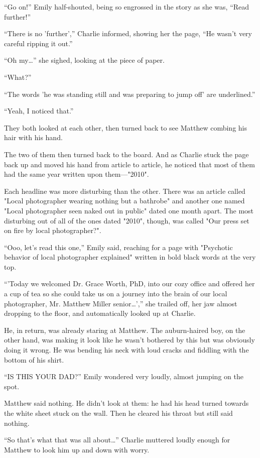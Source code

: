 “Go on!” Emily half-shouted, being so engrossed in the story as she was, “Read further!”

“There is no 'further',” Charlie informed, showing her the page, “He wasn't very careful ripping it out.”

“Oh my…” she sighed, looking at the piece of paper.

“What?”

“The words 'he was standing still and was preparing to jump off' are underlined.”

“Yeah, I noticed that.”

They both looked at each other, then turned back to see Matthew combing his hair with his hand.

The two of them then turned back to the board. And as Charlie stuck the page back up and moved his hand from article to article, he noticed that most of them had the same year written upon them—"2010".

Each headline was more disturbing than the other. There was an article called "Local photographer wearing nothing but a bathrobe" and another one named "Local photographer seen naked out in public" dated one month apart. The most disturbing out of all of the ones dated "2010", though, was called "Our press set on fire by local photographer?".

“Ooo, let's read this one,” Emily said, reaching for a page with "Psychotic behavior of local photographer explained" written in bold black words at the very top.

“'Today we welcomed Dr. Grace Worth, PhD, into our cozy office and offered her a cup of tea so she could take us on a journey into the brain of our local photographer, Mr. Matthew Miller senior…',” she trailed off, her jaw almost dropping to the floor, and automatically looked up at Charlie.

He, in return, was already staring at Matthew. The auburn-haired boy, on the other hand, was making it look like he wasn't bothered by this but was obviously doing it wrong. He was bending his neck with loud cracks and fiddling with the bottom of his shirt.

“IS THIS YOUR DAD?” Emily wondered very loudly, almost jumping on the spot.

Matthew said nothing. He didn't look at them: he had his head turned towards the white sheet stuck on the wall. Then he cleared his throat but still said nothing.

“So that's what that was all about…” Charlie muttered loudly enough for Matthew to look him up and down with worry.


